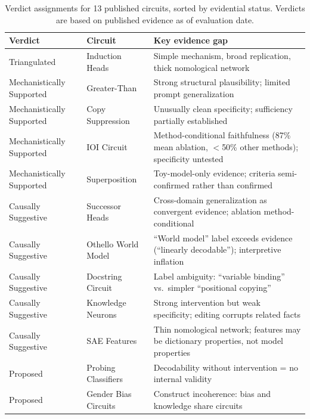 \documentclass[10pt]{article}
\begin{document}
\begin{table}[H]
\centering
\small
\caption{Verdict assignments for 13 published circuits, sorted by evidential status. Verdicts are based on published evidence as of evaluation date.}
\label{tab:case-studies}
\renewcommand{\arraystretch}{1.2}
\begin{tabular}{@{}l>{\raggedright\arraybackslash}p{3cm}>{\raggedright\arraybackslash}p{7cm}@{}}
\toprule
\textbf{Verdict} & \textbf{Circuit} & \textbf{Key evidence gap} \\
\midrule
Triangulated & Induction Heads & Simple mechanism, broad replication, thick nomological network \\
\midrule
Mechanistically Supported & Greater-Than & Strong structural plausibility; limited prompt generalization \\
\midrule
Mechanistically Supported & Copy Suppression & Unusually clean specificity; sufficiency partially established \\
\midrule
Mechanistically Supported & IOI Circuit & Method-conditional faithfulness (87\% mean ablation, $<$50\% other methods); specificity untested \\
\midrule
Mechanistically Supported & Superposition & Toy-model-only evidence; criteria semi-confirmed rather than confirmed \\
\midrule
Causally Suggestive & Successor Heads & Cross-domain generalization as convergent evidence; ablation method-conditional \\
\midrule
Causally Suggestive & Othello World Model & ``World model'' label exceeds evidence (``linearly decodable''); interpretive inflation \\
\midrule
Causally Suggestive & Docstring Circuit & Label ambiguity: ``variable binding'' vs.\ simpler ``positional copying'' \\
\midrule
Causally Suggestive & Knowledge Neurons & Strong intervention but weak specificity; editing corrupts related facts \\
\midrule
Causally Suggestive & SAE Features & Thin nomological network; features may be dictionary properties, not model properties \\
\midrule
Proposed & Probing Classifiers & Decodability without intervention = no internal validity \\
\midrule
Proposed & Gender Bias Circuits & Construct incoherence: bias and knowledge share circuits \\
\bottomrule
\end{tabular}
\end{table}
\end{document}
